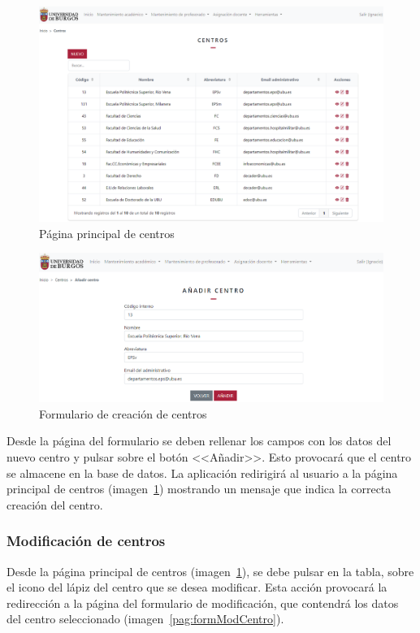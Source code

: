 \begin{figure}
	\centering
	\includegraphics[width=\textwidth]{../img/Anexos/Manual usuario/centros.png}
	\caption{Página principal de centros}\label{pag:centros}
\end{figure}

\begin{figure}
	\centering
	\includegraphics[width=\textwidth]{../img/Anexos/Manual usuario/formCentro.png}
	\caption{Formulario de creación de centros}\label{pag:formCentro}
\end{figure}

Desde la página del formulario se deben rellenar los campos con los datos del nuevo centro y pulsar sobre el botón <<Añadir>>.
Esto provocará que el centro se almacene en la base de datos. 
La aplicación redirigirá al usuario a la página principal de centros (imagen~\ref{pag:centros}) mostrando un mensaje que indica la correcta creación del centro.

\subsubsection{Modificación de centros}
Desde la página principal de centros (imagen~\ref{pag:centros}), se debe pulsar en la tabla, sobre el icono del lápiz del centro que se desea modificar.
Esta acción provocará la redirección a la página del formulario de modificación, que contendrá los datos del centro seleccionado (imagen~\ref{pag:formModCentro}).

